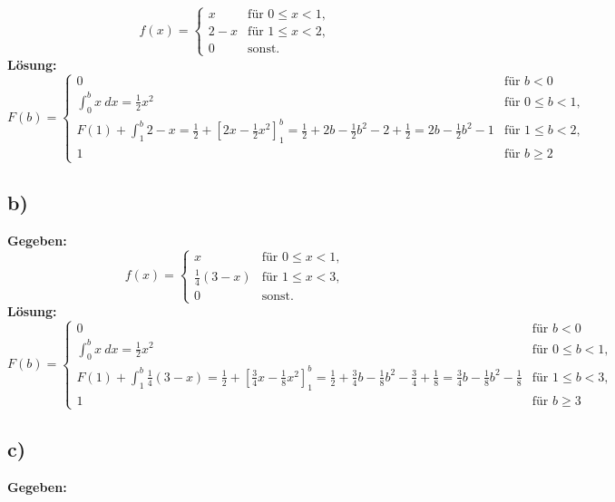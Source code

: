 \documentclass{article}
\begin{document}
\[
f(x) = \begin{cases}
    x & \text{für } 0 \leq x < 1, \\
    2 - x & \text{für } 1 \leq x < 2, \\
    0 & \text{sonst.}
\end{cases}
\]
\textbf{Lösung:} \\
\[
F(b) = \begin{cases}
    0 & \text{für } b < 0 \\
    \int_{0}^{b}x ~dx = \frac{1}{2}x^{2} & \text{für } 0 \leq b < 1, \\
    F(1) + \int_{1}^{b} 2 - x = \frac{1}{2} + [2x - \frac{1}{2}x^{2}]_{1}^{b} = \frac{1}{2} + 2b - \frac{1}{2}b^{2} - 2 + \frac{1}{2}= 2b - \frac{1}{2}b^{2} - 1  & \text{für } 1 \leq b < 2, \\
    1 & \text{für } b \geq 2
\end{cases}
\]


\subsection*{b)}
\textbf{Gegeben:} \\

\[
f(x) = \begin{cases}
    x & \text{für } 0 \leq x < 1, \\
    \frac{1}{4}(3-x) & \text{für } 1 \leq x < 3, \\
    0 & \text{sonst.}
\end{cases}
\]
\textbf{Lösung:} \\
\[
F(b) = \begin{cases}
    0 & \text{für } b < 0 \\
    \int_{0}^{b}x ~dx = \frac{1}{2}x^{2} & \text{für } 0 \leq b < 1, \\
    F(1) + \int_{1}^{b} \frac{1}{4}(3-x) = \frac{1}{2} + [\frac{3}{4}x - \frac{1}{8}x^{2}]_{1}^{b} = \frac{1}{2} + \frac{3}{4}b - \frac{1}{8}b^{2} - \frac{3}{4} + \frac{1}{8}= \frac{3}{4}b - \frac{1}{8}b^{2} - \frac{1}{8}  & \text{für } 1 \leq b < 3, \\
    1 & \text{für } b \geq 3
\end{cases}
\]

\subsection*{c)}
\textbf{Gegeben:} \\
\end{document}
